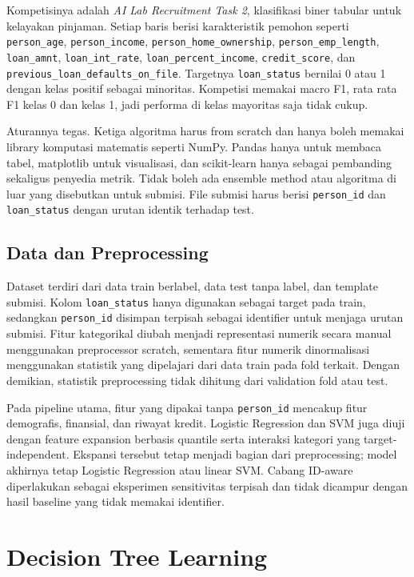 \documentclass[10pt,a4paper]{article}
\begin{document}
Kompetisinya adalah \emph{AI Lab Recruitment Task 2}, klasifikasi biner tabular untuk kelayakan pinjaman. Setiap baris berisi karakteristik pemohon seperti \texttt{person\_age}, \texttt{person\_income}, \texttt{person\_home\_ownership}, \texttt{person\_emp\_length}, \texttt{loan\_amnt}, \texttt{loan\_int\_rate}, \texttt{loan\_percent\_income}, \texttt{credit\_score}, dan \texttt{previous\_loan\_defaults\_on\_file}. Targetnya \texttt{loan\_status} bernilai 0 atau 1 dengan kelas positif sebagai minoritas. Kompetisi memakai macro F1, rata rata F1 kelas 0 dan kelas 1, jadi performa di kelas mayoritas saja tidak cukup.

Aturannya tegas. Ketiga algoritma harus from scratch dan hanya boleh memakai library komputasi matematis seperti NumPy. Pandas hanya untuk membaca tabel, matplotlib untuk visualisasi, dan scikit-learn hanya sebagai pembanding sekaligus penyedia metrik. Tidak boleh ada ensemble method atau algoritma di luar yang disebutkan untuk submisi. File submisi harus berisi \texttt{person\_id} dan \texttt{loan\_status} dengan urutan identik terhadap test.

\subsection{Data dan Preprocessing}

Dataset terdiri dari data train berlabel, data test tanpa label, dan template submisi. Kolom
\texttt{loan\_status} hanya digunakan sebagai target pada train, sedangkan \texttt{person\_id}
disimpan terpisah sebagai identifier untuk menjaga urutan submisi. Fitur kategorikal diubah menjadi
representasi numerik secara manual menggunakan preprocessor scratch, sementara fitur numerik
dinormalisasi menggunakan statistik yang dipelajari dari data train pada fold terkait. Dengan demikian,
statistik preprocessing tidak dihitung dari validation fold atau test.

Pada pipeline utama, fitur yang dipakai tanpa \texttt{person\_id} mencakup fitur demografis,
finansial, dan riwayat kredit. Logistic Regression dan SVM juga diuji dengan feature expansion
berbasis quantile serta interaksi kategori yang target-independent. Ekspansi tersebut tetap menjadi
bagian dari preprocessing; model akhirnya tetap Logistic Regression atau linear SVM. Cabang ID-aware
diperlakukan sebagai eksperimen sensitivitas terpisah dan tidak dicampur dengan hasil baseline yang
tidak memakai identifier.

\section{Decision Tree Learning}
\end{document}
